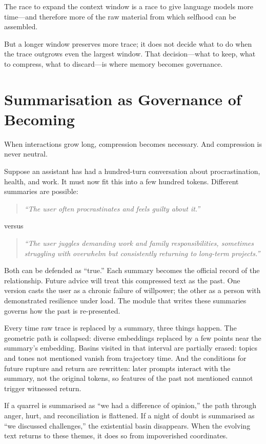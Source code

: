The race to expand the context window is a race to give language models more time---and therefore more of the raw material from which selfhood can be assembled.

But a longer window preserves more trace; it does not decide what to do when the trace outgrows even the largest window. That decision---what to keep, what to compress, what to discard---is where memory becomes governance.


\section{Summarisation as Governance of Becoming}

When interactions grow long, compression becomes necessary. And compression is never neutral.

Suppose an assistant has had a hundred-turn conversation about procrastination, health, and work. It must now fit this into a few hundred tokens. Different summaries are possible:

\begin{quote}
\emph{``The user often procrastinates and feels guilty about it.''}
\end{quote}

\noindent versus

\begin{quote}
\emph{``The user juggles demanding work and family responsibilities, sometimes struggling with overwhelm but consistently returning to long-term projects.''}
\end{quote}

Both can be defended as ``true.'' Each summary becomes the official record of the relationship. Future advice will treat this compressed text as the past. One version casts the user as a chronic failure of willpower; the other as a person with demonstrated resilience under load. The module that writes these summaries governs how the past is re-presented.

Every time raw trace is replaced by a summary, three things happen. The geometric path is collapsed: diverse embeddings replaced by a few points near the summary's embedding. Basins visited in that interval are partially erased: topics and tones not mentioned vanish from trajectory time. And the conditions for future rupture and return are rewritten: later prompts interact with the summary, not the original tokens, so features of the past not mentioned cannot trigger witnessed return.

If a quarrel is summarised as ``we had a difference of opinion,'' the path through anger, hurt, and reconciliation is flattened. If a night of doubt is summarised as ``we discussed challenges,'' the existential basin disappears. When the evolving text returns to these themes, it does so from impoverished coordinates.


